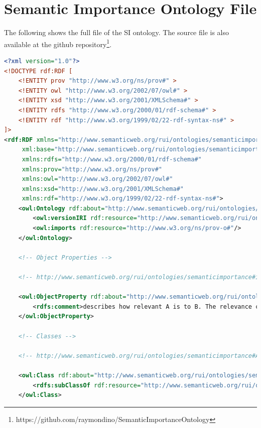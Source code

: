 %
\section{Semantic Importance Ontology File}
The following shows the full file of the SI ontology.
The source file is also available at the github repository\footnote{https://github.com/raymondino/SemanticImportanceOntology}.
\begin{lstlisting}[language=XML,caption={Semantic Importance Ontology File (update this file)}]
<?xml version="1.0"?>
<!DOCTYPE rdf:RDF [
    <!ENTITY prov "http://www.w3.org/ns/prov#" >
    <!ENTITY owl "http://www.w3.org/2002/07/owl#" >
    <!ENTITY xsd "http://www.w3.org/2001/XMLSchema#" >
    <!ENTITY rdfs "http://www.w3.org/2000/01/rdf-schema#" >
    <!ENTITY rdf "http://www.w3.org/1999/02/22-rdf-syntax-ns#" >
]>
<rdf:RDF xmlns="http://www.semanticweb.org/rui/ontologies/semanticimportance#"
     xml:base="http://www.semanticweb.org/rui/ontologies/semanticimportance"
     xmlns:rdfs="http://www.w3.org/2000/01/rdf-schema#"
     xmlns:prov="http://www.w3.org/ns/prov#"
     xmlns:owl="http://www.w3.org/2002/07/owl#"
     xmlns:xsd="http://www.w3.org/2001/XMLSchema#"
     xmlns:rdf="http://www.w3.org/1999/02/22-rdf-syntax-ns#">
    <owl:Ontology rdf:about="http://www.semanticweb.org/rui/ontologies/semanticimportance">
        <owl:versionIRI rdf:resource="http://www.semanticweb.org/rui/ontologies/semanticimportance/1.0"/>
        <owl:imports rdf:resource="http://www.w3.org/ns/prov-o#"/>
    </owl:Ontology>
    
    <!-- Object Properties -->
    
    <!-- http://www.semanticweb.org/rui/ontologies/semanticimportance#isRelevantTo -->

    <owl:ObjectProperty rdf:about="http://www.semanticweb.org/rui/ontologies/semanticimportance#isRelevantTo">
        <rdfs:comment>describes how relevant A is to B. The relevance can be described with a relevance ontology</rdfs:comment>
    </owl:ObjectProperty>
    
    <!-- Classes -->
    
    <!-- http://www.semanticweb.org/rui/ontologies/semanticimportance#ArrivalTimestamp -->

    <owl:Class rdf:about="http://www.semanticweb.org/rui/ontologies/semanticimportance#ArrivalTimestamp">
        <rdfs:subClassOf rdf:resource="http://www.semanticweb.org/rui/ontologies/semanticimportance#TemporalProvenance"/>
    </owl:Class>


\end{lstlisting}
